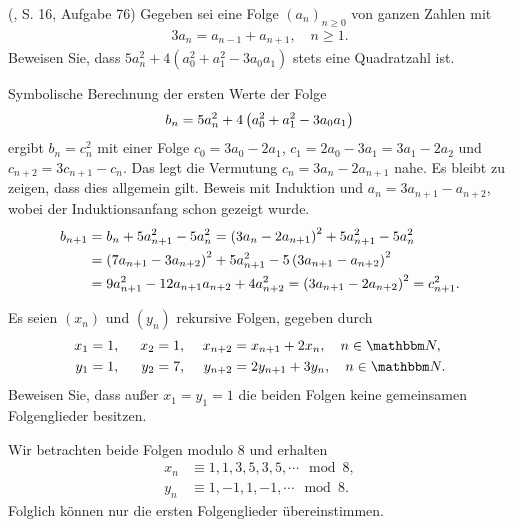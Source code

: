 \documentclass[11pt,a4paper]{article}
\begin{document}
\begin{aufgabe} (\cite{BB}, S. 16, Aufgabe 76)
Gegeben sei eine Folge $(a_n)_{n\ge 0}$ von ganzen Zahlen mit
\begin{gather*}
3 a_{n}= a_{n-1}  +a_{n+1}, \quad n\ge 1.
\end{gather*}
Beweisen Sie, dass $5a_n^2 +4( a_0^2 +a_1^2 -3a_0a_1) $ stets eine Quadratzahl
ist.
\end{aufgabe}

\begin{loesung}
  Symbolische Berechnung der ersten Werte der Folge
\begin{gather*}
  b_n=5a_n^2+4\left(a_0^2+a_1^2-3a_0a_1\right)
\end{gather*}
ergibt $b_n=c_n^2$ mit einer Folge $c_0=3a_0-2a_1$, $c_1=2a_0-3a_1=3a_1-2a_2$
und $c_{n+2}=3c_{n+1}-c_n$.  Das legt die Vermutung $c_n=3a_n-2a_{n+1}$ nahe.
Es bleibt zu zeigen, dass dies allgemein gilt.  Beweis mit Induktion und
$a_n=3a_{n+1}-a_{n+2}$, wobei der Induktionsanfang schon gezeigt wurde.
\begin{align*}
  b_{n+1}&=b_n+5a_{n+1}^2-5a_n^2=\left(3a_n-2a_{n+1}\right)^2+5a_{n+1}^2-5a_n^2\\
  &=\left(7a_{n+1}-3a_{n+2}\right)^2+5a_{n+1}^2-5\left(3a_{n+1}-a_{n+2}\right)^2\\
  &=9a_{n+1}^2-12a_{n+1}a_{n+2}+4a_{n+2}^2=\left(3a_{n+1}-2a_{n+2}\right)^2=c_{n+1}^2.
\end{align*}
\end{loesung}

\begin{aufgabe} 
Es seien $(x_n)$ und $(y_n)$ rekursive Folgen, gegeben durch
\begin{alignat*}{3}
x_1&=1,\,\,& x_2& = 1,& \,\, x_{n+2}& =x_{n+1} +2 x_{n} ,\quad n\in\N,\\
y_1&= 1,&\,\, y_2&= 7,&\,\, y_{n+2}& = 2y_{n+1} +3 y_{n},\quad n\in \N.
\end{alignat*}
Beweisen Sie, dass außer $x_1=y_1=1$ die beiden Folgen keine gemeinsamen
Folgenglieder besitzen.
\end{aufgabe}

\begin{loesung} Wir betrachten beide Folgen modulo $8$ und erhalten
\begin{align*}
x_n&\equiv 1,1,3,5,3,5,\cdots \mod{8},\\
y_n&\equiv  1,-1,1,-1,\cdots \mod{8}.
\end{align*}
Folglich können nur die ersten Folgenglieder übereinstimmen.
\end{loesung}
\end{document}
